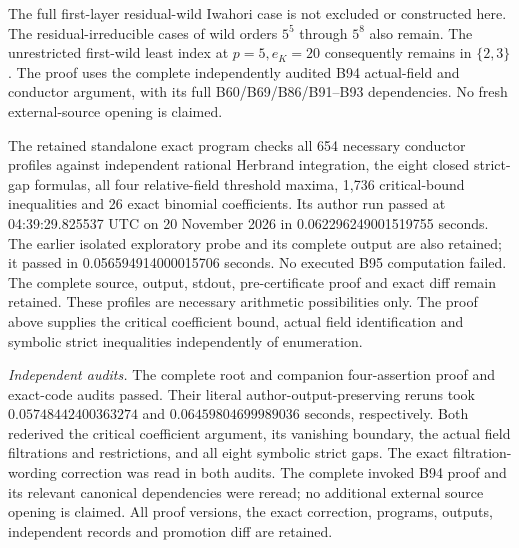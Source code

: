 \begin{remark}
\label{rem:B-RD95-scope}
The full first-layer residual-wild Iwahori case is not excluded or
constructed here. The residual-irreducible cases of wild orders
$5^5$ through $5^8$ also remain. The unrestricted first-wild least
index at $p=5,e_K=20$ consequently remains in $\{2,3\}$.
The proof uses the complete independently audited B94 actual-field
and conductor argument, with its full B60/B69/B86/B91--B93
dependencies. No fresh external-source opening is claimed.

The retained standalone exact program
checks all 654 necessary conductor profiles against independent
rational Herbrand integration, the eight closed strict-gap formulas,
all four relative-field threshold maxima, 1,736 critical-bound
inequalities and 26 exact binomial coefficients. Its author run
passed at 04:39:29.825537 UTC on 20 November 2026 in
0.062296249001519755 seconds. The earlier isolated exploratory
probe and its complete output are also retained; it passed in
0.056594914000015706 seconds. No executed B95 computation failed.
The complete source, output, stdout, pre-certificate proof and exact
diff remain retained. These profiles are necessary arithmetic
possibilities only. The proof above supplies the critical coefficient
bound, actual field identification and symbolic strict inequalities
independently of enumeration.

\smallskip
\noindent\emph{Independent audits.}
The complete root and companion four-assertion proof and exact-code
audits passed. Their literal author-output-preserving reruns took
\(0.05748442400363274\) and \(0.06459804699989036\) seconds, respectively.
Both rederived the critical coefficient argument, its vanishing
boundary, the actual field filtrations and restrictions, and all
eight symbolic strict gaps. The exact filtration-wording correction
was read in both audits. The complete invoked B94 proof and its
relevant canonical dependencies were reread; no additional external
source opening is claimed. All proof versions, the exact correction,
programs, outputs, independent records and promotion diff are retained.
\end{remark}
